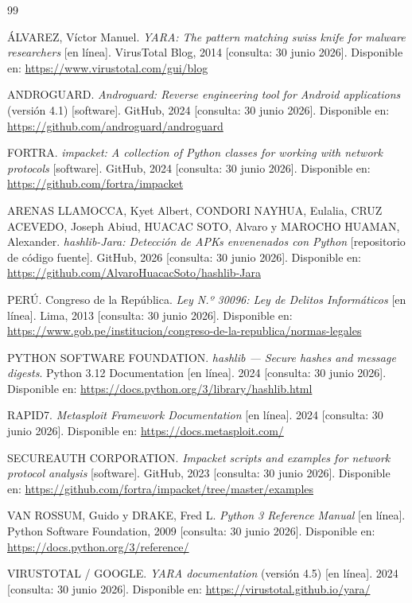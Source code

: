 \documentclass[12pt,a4paper]{article}
\begin{document}
\begin{thebibliography}{99}

ÁLVAREZ, Víctor Manuel. \textit{YARA: The pattern matching swiss knife for
malware researchers} [en línea]. VirusTotal Blog, 2014
[consulta: 30 junio 2026]. Disponible en:
\url{https://www.virustotal.com/gui/blog}

ANDROGUARD. \textit{Androguard: Reverse engineering tool for Android
applications} (versión 4.1) [software]. GitHub, 2024
[consulta: 30 junio 2026]. Disponible en:
\url{https://github.com/androguard/androguard}

FORTRA. \textit{impacket: A collection of Python classes for working
with network protocols} [software]. GitHub, 2024
[consulta: 30 junio 2026]. Disponible en:
\url{https://github.com/fortra/impacket}

ARENAS LLAMOCCA, Kyet Albert, CONDORI NAYHUA, Eulalia, CRUZ ACEVEDO,
Joseph Abiud, HUACAC SOTO, Alvaro y MAROCHO HUAMAN, Alexander.
\textit{hashlib-Jara: Detección de APKs envenenados con Python}
[repositorio de código fuente]. GitHub, 2026
[consulta: 30 junio 2026]. Disponible en:
\url{https://github.com/AlvaroHuacacSoto/hashlib-Jara}

PERÚ. Congreso de la República. \textit{Ley N.º 30096: Ley de Delitos
Informáticos} [en línea]. Lima, 2013
[consulta: 30 junio 2026]. Disponible en:
\url{https://www.gob.pe/institucion/congreso-de-la-republica/normas-legales}

PYTHON SOFTWARE FOUNDATION. \textit{hashlib --- Secure hashes and
message digests}. Python 3.12 Documentation [en línea]. 2024
[consulta: 30 junio 2026]. Disponible en:
\url{https://docs.python.org/3/library/hashlib.html}

RAPID7. \textit{Metasploit Framework Documentation} [en línea]. 2024
[consulta: 30 junio 2026]. Disponible en:
\url{https://docs.metasploit.com/}

SECUREAUTH CORPORATION. \textit{Impacket scripts and examples for
network protocol analysis} [software]. GitHub, 2023
[consulta: 30 junio 2026]. Disponible en:
\url{https://github.com/fortra/impacket/tree/master/examples}

VAN ROSSUM, Guido y DRAKE, Fred L. \textit{Python 3 Reference Manual}
[en línea]. Python Software Foundation, 2009
[consulta: 30 junio 2026]. Disponible en:
\url{https://docs.python.org/3/reference/}

VIRUSTOTAL / GOOGLE. \textit{YARA documentation} (versión 4.5) [en línea]. 2024
[consulta: 30 junio 2026]. Disponible en:
\url{https://virustotal.github.io/yara/}

\end{thebibliography}
\end{document}
